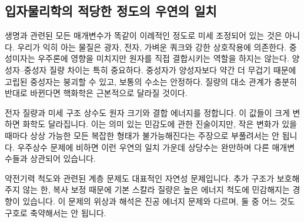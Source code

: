 \begin{classroomqa}
\end{classroomqa}

\subsection{입자물리학의 적당한 정도의 우연의 일치}

생명과 관련된 모든 매개변수가 똑같이 이례적인 정도로 미세 조정되어 있는 것은 아니다. 우리가 익히 아는 물질은 광자, 전자, 가벼운 쿼크와 강한 상호작용에 의존한다. 중성미자는 우주론에 영향을 미치지만 원자를 직접 결합시키는 역할을 하지는 않는다. 양성자--중성자 질량 차이는 특히 중요하다. 중성자가 양성자보다 약간 더 무겁기 때문에 고립된 중성자는 붕괴할 수 있고, 보통의 수소는 안정하다. 질량의 대소 관계가 충분히 반대로 바뀐다면 핵화학은 근본적으로 달라질 것이다.

전자 질량과 미세 구조 상수도 원자 크기와 결합 에너지를 정합니다. 이 값들이 크게 변하면 화학도 달라집니다. 이는 의미 있는 민감도에 관한 진술이지만, 작은 변화가 있을 때마다 상상 가능한 모든 복잡한 형태가 불가능해진다는 주장으로 부풀려서는 안 됩니다. 우주상수 문제에 비하면 이런 우연의 일치 가운데 상당수는 완만하며 다른 매개변수들과 상관되어 있습니다.

약전기력 척도와 관련된 계층 문제도 대표적인 자연성 문제입니다. 추가 구조가 보호해 주지 않는 한, 복사 보정 때문에 기본 스칼라 질량은 높은 에너지 척도에 민감해지는 경향이 있습니다. 이 문제의 위상과 해석은 진공 에너지 문제와 다르며, 둘 중 어느 것도 구호로 축약해서는 안 됩니다.

\begin{classroomqa}
\end{classroomqa}

\begin{classroomqa}
\end{classroomqa}

